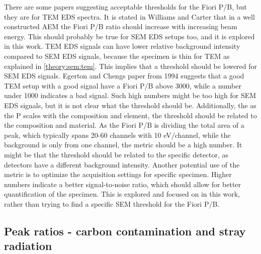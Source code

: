 There are some papers \cite{egerton_nio_characterization_1994,egerton_nio_characterization_1994,ted_pella_nio_tem_2019} suggesting acceptable thresholds for the Fiori P/B, but they are for TEM EDS spectra.
It is stated in Williams and Carter \cite[p. 614]{williams_carter_tem_2009} that in a well constructed AEM the Fiori P/B ratio should increase with increasing beam energy.
This should probably be true for SEM EDS setups too, and it is explored in this work.
TEM EDS signals can have lower relative background intensity compared to SEM EDS signals, because the specimen is thin for TEM as explained in \cref{theory:sem:tem}.
This implies that a threshold should be lowered for SEM EDS signals.
Egerton and Chengs paper from 1994 \cite{egerton_nio_characterization_1994} suggests that a good TEM setup with a good signal have a Fiori P/B above 3000, while a number under 1000 indicates a bad signal.
Such high numbers might be too high for SEM EDS signals, but it is not clear what the threshold should be.
Additionally, the as the P scales with the composition and element, the threshold should be related to the composition and material.
As the Fiori P/B is dividing the total area of a peak, which typically spans 20-60 channels with 10 eV/channel, while the background is only from one channel, the metric should be a high number.
It might be that the threshold should be related to the specific detector, as detectors have a different background intensity.
Another potential use of the metric is to optimize the acquisition settings for specific specimen.
Higher numbers indicate a better signal-to-noise ratio, which should allow for better quantification of the specimen.
This is explored and focused on in this work, rather than trying to find a specific SEM threshold for the Fiori P/B.






\subsection{Peak ratios - carbon contamination and stray radiation}
\label{theory:eds_performance:peakratio}

